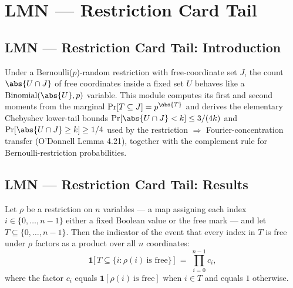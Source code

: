\section{LMN --- Restriction Card Tail}
\subsection*{LMN --- Restriction Card Tail: Introduction}
Under a Bernoulli($p$)-random restriction with free-coordinate set $J$, the count
$\abs{U \cap J}$ of free coordinates inside a fixed set $U$ behaves like a
$\mathrm{Binomial}(\abs{U}, p)$ variable. This module computes its first and second moments
from the marginal $\Pr[T \subseteq J] = p^{\abs{T}}$ and derives the elementary Chebyshev
lower-tail bounds $\Pr[\abs{U \cap J} < k] \le 3/(4k)$ and $\Pr[\abs{U \cap J} \ge k] \ge 1/4$
used by the restriction $\Rightarrow$ Fourier-concentration transfer (O'Donnell Lemma 4.21),
together with the complement rule for Bernoulli-restriction probabilities.

\subsection*{LMN --- Restriction Card Tail: Results}

\begin{lemma}
\label{RestrictionFourier.indicator_subset_eq_prod}
\leanok
{}
Let $\rho$ be a restriction on $n$ variables — a map assigning each index $i \in
\{0,\dots,n-1\}$ either a fixed Boolean value or the free mark — and let $T \subseteq
\{0,\dots,n-1\}$. Then the indicator of the event that every index in $T$ is free under
$\rho$ factors as a product over all $n$ coordinates: \[ \mathbf{1}\bigl[\,T \subseteq
\{i : \rho(i)\ \text{is free}\}\,\bigr] \;=\; \prod_{i=0}^{n-1} c_i, \] where the factor
$c_i$ equals $\mathbf{1}[\rho(i)\ \text{is free}]$ when $i \in T$ and equals $1$
otherwise.
\end{lemma}

